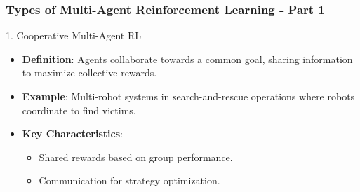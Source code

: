 \documentclass[aspectratio=169]{beamer}
\begin{document}
\begin{frame}[fragile]
    \frametitle{Types of Multi-Agent Reinforcement Learning - Part 1}
    \begin{block}{1. Cooperative Multi-Agent RL}
        \begin{itemize}
            \item \textbf{Definition}: Agents collaborate towards a common goal, sharing information to maximize collective rewards.
            \item \textbf{Example}: Multi-robot systems in search-and-rescue operations where robots coordinate to find victims.
            \item \textbf{Key Characteristics}:
            \begin{itemize}
                \item Shared rewards based on group performance.
                \item Communication for strategy optimization.
            \end{itemize}
        \end{itemize}
    \end{block}
\end{frame}
\end{document}
